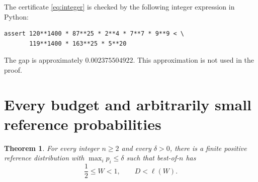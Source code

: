 \documentclass[11pt,a4paper]{article}
\newtheorem{theorem}{Theorem}
\begin{document}
The certificate \eqref{eq:integer} is checked by the following integer expression in Python:
\begin{verbatim}
assert 120**1400 * 87**25 * 2**4 * 7**7 * 9**9 < \
       119**1400 * 163**25 * 5**20
\end{verbatim}
The gap is approximately $0.002375504922$. This approximation is not used in the proof.

\section{Every budget and arbitrarily small reference probabilities}
\begin{theorem}\label{thm:every}
For every integer $n\geq2$ and every $\delta>0$, there is a finite positive reference distribution with $\max_i p_i\leq\delta$ such that best-of-$n$ has
\[
 \frac12\leq W<1,\qquad D<\ell(W).
\]
\end{theorem}
\end{document}

